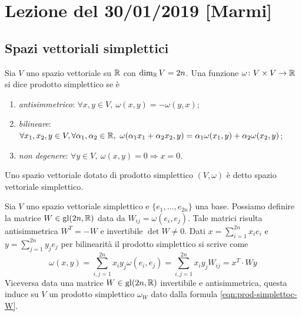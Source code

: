 \section{Lezione del 30/01/2019 [Marmi]}

\subsection{Spazi vettoriali simplettici}

\begin{definition}
    Sia $ V $ uno spazio vettoriale su $ \mathbb{R} $ con $ \dim_{\mathbb{R}} V = 2n $. Una funzione $ \omega \colon V \times V \to \mathbb{R} $ si dice prodotto simplettico se è
    \begin{enumerate}[label=(\roman*)]
        \item \emph{antisimmetrico}: $ \forall x, y \in V, \ \omega(x, y) = - \omega(y, x) $;
        \item \emph{bilineare}: $ \forall x_1, x_2, y \in V, \forall \alpha_1, \alpha_2 \in \mathbb{R}, \ \omega(\alpha_1 x_1 + \alpha_2 x_2, y) = \alpha_1 \omega(x_1, y) + \alpha_2 \omega(x_2, y) $;
        \item \emph{non degenere}: $ \forall y \in V, \ \omega(x, y) = 0 \Rightarrow x = 0 $.
    \end{enumerate}
    Uno spazio vettoriale dotato di prodotto simplettico $ (V, \omega) $ è detto spazio vettoriale simplettico.
\end{definition}

Sia $ V $ uno spazio vettoriale simplettico e $ \{e_1, \ldots, e_{2n}\} $ una base. Possiamo definire la matrice $ W \in \mathrm{gl}(2n, \mathbb{R}) $ data da $ W_{ij} = \omega(e_i, e_j) $. Tale matrici risulta antisimmetrica $ W^{T} = -W $ e invertibile $ \det{W} \neq 0 $. Dati $ x = \sum_{i=1}^{2n} x_i e_i $ e $ y = \sum_{j=1}^{2n} y_j e_j $ per bilinearità il prodotto simplettico si scrive come
\begin{equation} \label{eqn:prod-simplettoc-W}
    \omega(x, y) = \sum_{i, j=1}^{2n} x_i y_j \omega(e_i, e_j) = \sum_{i, j=1}^{2n} x_i y_j W_{ij} = x^T \cdot W y
\end{equation}
Viceversa data una matrice $ W \in \mathrm{gl}(2n, \mathbb{R}) $ invertibile e antisimmetrica, questa induce su $ V $ un prodotto simplettico $ \omega_W $ dato dalla formula \eqref{eqn:prod-simplettoc-W}. \\

